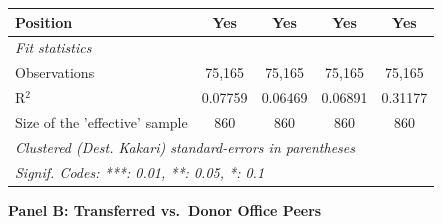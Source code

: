 \begin{table}[htbp]
\begin{threeparttable}
\begin{tabular}{lcccc}
   Position                       & Yes             & Yes                & Yes             & Yes\\  
   \midrule
   \emph{Fit statistics}\\
   Observations                   & 75,165          & 75,165             & 75,165          & 75,165\\  
   R$^2$                          & 0.07759         & 0.06469            & 0.06891         & 0.31177\\  
   Size of the 'effective' sample & 860             & 860                & 860             & 860\\  
   \midrule \midrule
   \multicolumn{5}{l}{\emph{Clustered (Dest. Kakari) standard-errors in parentheses}}\\
   \multicolumn{5}{l}{\emph{Signif. Codes: ***: 0.01, **: 0.05, *: 0.1}}\\
\end{tabular}

\bigskip

\textbf{Panel B: Transferred vs.\ Donor Office Peers}
\medskip


\end{threeparttable}
\end{table}
